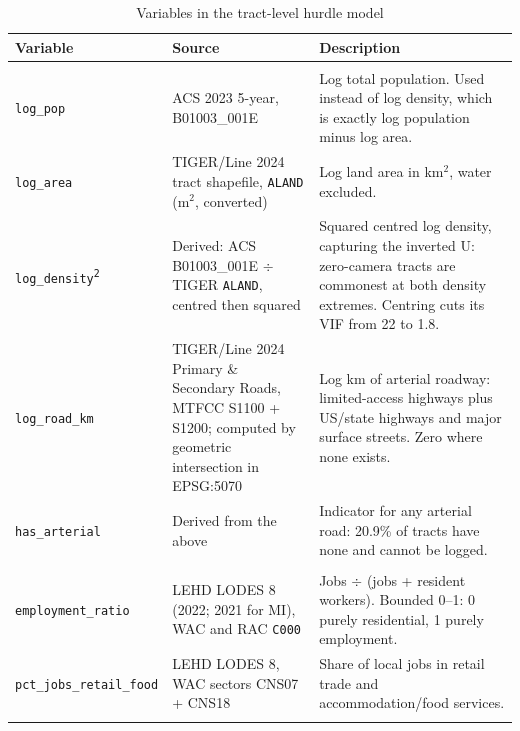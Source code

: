 %

\begin{table}[htbp]
\centering\small
\caption{Variables in the tract-level hurdle model}
\label{tab:tract_variable_list}
\begin{tabular}{@{}
  >{\raggedright\arraybackslash}p{}
  >{\raggedright\arraybackslash}p{}
  >{\raggedright\arraybackslash}p{}@{}}
\toprule
\textbf{Variable} & \textbf{Source} & \textbf{Description} \\
\midrule

\multicolumn{3}{@{}l}{\textit{Exposure and scale}} \\
\texttt{log\_pop} &
ACS 2023 5-year, B01003\_001E &
Log total population. Used instead of log density, which is exactly log population minus log area. \\
\texttt{log\_area} &
TIGER/Line 2024 tract shapefile, \texttt{ALAND} (m$^2$, converted) &
Log land area in km$^2$, water excluded. \\
\texttt{log\_density\textsuperscript{2}} &
Derived: ACS B01003\_001E $\div$ TIGER \texttt{ALAND}, centred then squared &
Squared centred log density, capturing the inverted U: zero-camera tracts are commonest at both density extremes. Centring cuts its VIF from 22 to 1.8. \\
\texttt{log\_road\_km} &
TIGER/Line 2024 Primary \& Secondary Roads, MTFCC S1100 + S1200; computed by geometric intersection in EPSG:5070 &
Log km of arterial roadway: limited-access highways plus US/state highways and major surface streets. Zero where none exists. \\
\texttt{has\_arterial} &
Derived from the above &
Indicator for any arterial road: 20.9\% of tracts have none and cannot be logged. \\
\addlinespace

\multicolumn{3}{@{}l}{\textit{Land use}} \\
\texttt{employment\_ratio} &
LEHD LODES 8 (2022; 2021 for MI), WAC and RAC \texttt{C000} &
Jobs $\div$ (jobs + resident workers). Bounded 0--1: 0 purely residential, 1 purely employment. \\
\texttt{pct\_jobs\_retail\_food} &
LEHD LODES 8, WAC sectors CNS07 + CNS18 &
Share of local jobs in retail trade and accommodation/food services. \\
\addlinespace


\end{tabular}
\end{table}
